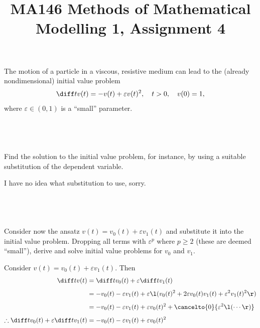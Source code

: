 \documentclass[a4paper]{article}
\title{MA146 Methods of Mathematical Modelling 1, Assignment 4}
\begin{document}
\maketitle

\setlength{\parindent}{0em}
\setlength{\parskip}{1em}


\begin{questionbody}
The motion of a particle in a viscous, resistive medium can lead to the (already nondimensional) initial value problem \[
\diff t v(t) = -v(t) + \varepsilon v(t)^2, \quad t > 0, \quad v(0) = 1,
\] where $\varepsilon \in (0, 1)$ is a \enquote{small} parameter.
\end{questionbody}

\subsection{~} %

\begin{questionbody}
Find the solution to the initial value problem, for instance, by using a suitable substitution of the dependent variable.
\end{questionbody}

I have no idea what substitution to use, sorry.

\subsection{~} %

\begin{questionbody}
Consider now the ansatz $v(t) = v_0(t) + \varepsilon v_1(t)$ and substitute it into the initial value problem. Dropping all terms with $\varepsilon^p$ where $p \ge 2$ (these are deemed \enquote{small}), derive and solve initial value problems for $v_0$ and $v_1$.
\end{questionbody}

Consider $v(t) = v_0(t) + \varepsilon v_1(t)$. Then \begin{align*}
	\diff t v(t) &= \diff t v_0(t) + \varepsilon \diff t v_1(t)\\[1ex]
				 &= -v_0(t) - \varepsilon v_1(t) + \varepsilon \l(v_0(t)^2 + 2 \varepsilon v_0(t) v_1(t) + \varepsilon^2 v_1(t)^2 \r)\\[1ex]
				 &= -v_0(t) - \varepsilon v_1(t) + \varepsilon v_0(t)^2 + \cancelto{0}{\varepsilon^2 \l(\cdots\r)}\\[1ex]
	\therefore \diff t v_0(t) + \varepsilon \diff t v_1(t) &= -v_0(t) - \varepsilon v_1(t) + \varepsilon v_0(t)^2
\end{align*}
\end{document}
